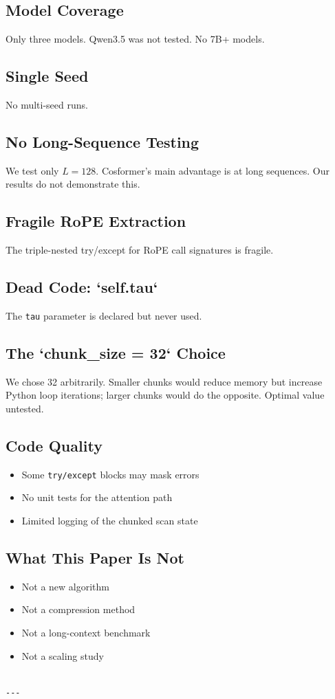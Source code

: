 \subsection{Model Coverage}

Only three models. Qwen3.5 was not tested. No 7B+ models.

\subsection{Single Seed}

No multi-seed runs.

\subsection{No Long-Sequence Testing}

We test only $L = 128$. Cosformer's main advantage is at long sequences. 
Our results do not demonstrate this.

\subsection{Fragile RoPE Extraction}

The triple-nested try/except for RoPE call signatures is fragile.

\subsection{Dead Code: `self.tau`}

The \texttt{tau} parameter is declared but never used.

\subsection{The `chunk\_size = 32` Choice}

We chose 32 arbitrarily. Smaller chunks would reduce memory but increase 
Python loop iterations; larger chunks would do the opposite. Optimal value 
untested.

\subsection{Code Quality}

\begin{itemize}
\item Some \texttt{try/except} blocks may mask errors
\item No unit tests for the attention path
\item Limited logging of the chunked scan state

\end{itemize}
\subsection{What This Paper Is Not}

\begin{itemize}
\item Not a new algorithm
\item Not a compression method
\item Not a long-context benchmark
\item Not a scaling study
\end{itemize}
\begin{lstlisting}

---
\end{lstlisting}